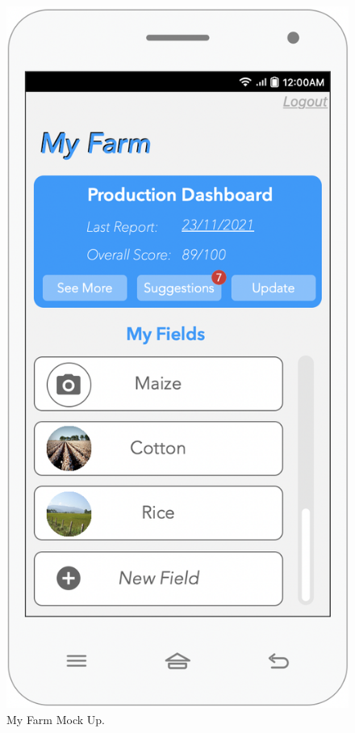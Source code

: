 \begin{multicols}{3}
 
\begin{figure}[H]
 \centering
\includegraphics[scale=0.35]{../images_diagrams/mock_ups/myfarm100.png}
\caption{\label{fig:mock_farm}My Farm Mock Up.}
 \end{figure}
 

\end{multicols}

